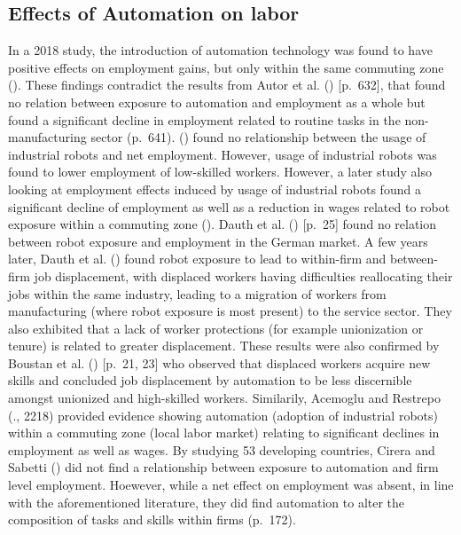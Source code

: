 \documentclass[
  11,
  a4paperpaper,
]{article}
\begin{document}
\subsection{Effects of Automation on
labor}\label{effects-of-automation-on-labor}

In a 2018 study, the introduction of automation technology was found to
have positive effects on employment gains, but only within the same
commuting zone (). These findings contradict the results from Autor et al.
() {[}p.~632{]}, that found no
relation between exposure to automation and employment as a whole but
found a significant decline in employment related to routine tasks in
the non-manufacturing sector (p.~641).
()
found no relationship between the usage of industrial robots and net
employment. However, usage of industrial robots was found to lower
employment of low-skilled workers. However, a later study also looking
at employment effects induced by usage of industrial robots found a
significant decline of employment as well as a reduction in wages
related to robot exposure within a commuting zone
(). Dauth et al. ()
{[}p.~25{]} found no relation between robot exposure and employment in
the German market. A few years later, Dauth et al.
() found robot
exposure to lead to within-firm and between-firm job displacement, with
displaced workers having difficulties reallocating their jobs within the
same industry, leading to a migration of workers from manufacturing
(where robot exposure is most present) to the service sector. They also
exhibited that a lack of worker protections (for example unionization or
tenure) is related to greater displacement. These results were also
confirmed by Boustan et al.
() {[}p.~21, 23{]} who
observed that displaced workers acquire new skills and concluded job
displacement by automation to be less discernible amongst unionized and
high-skilled workers. Similarily, Acemoglu and Restrepo
(., 2218) provided
evidence showing automation (adoption of industrial robots) within a
commuting zone (local labor market) relating to significant declines in
employment as well as wages. By studying 53 developing countries, Cirera
and Sabetti () did not
find a relationship between exposure to automation and firm level
employment. Hoewever, while a net effect on employment was absent, in
line with the aforementioned literature, they did find automation to
alter the composition of tasks and skills within firms (p.~172).
\end{document}
